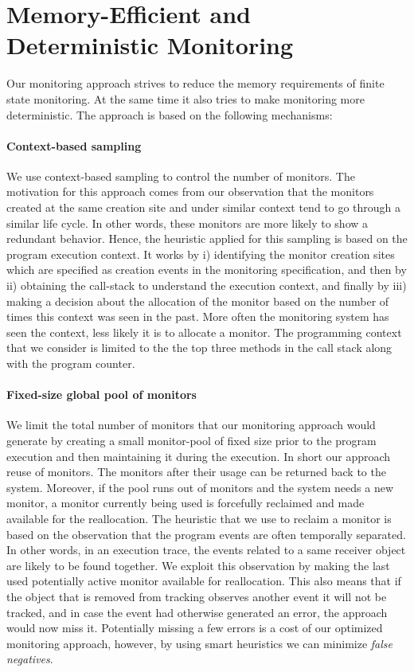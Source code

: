 \section{Memory-Efficient and Deterministic Monitoring}
\label{sec:approach}

Our monitoring approach strives to reduce the memory requirements of finite 
state monitoring. At the same time it also tries to make monitoring more 
deterministic. The approach is based on the following mechanisms:

\paragraph{Context-based sampling} We use context-based sampling to control the 
number of monitors. The motivation for this approach comes from our observation 
that the monitors created at the same creation site and under similar context 
tend to go through a similar life cycle. In other words, these monitors are more 
likely to show a redundant behavior. Hence, the heuristic applied for this 
sampling is based on the program execution context. It works by i) identifying 
the monitor creation sites which are specified as creation events in the 
monitoring specification, and then by ii) obtaining the call-stack to understand 
the execution context, and finally by iii) making a decision about the 
allocation of the monitor based on the number of times this context was seen in 
the past. More often the monitoring system has seen the context, less likely it 
is to allocate a monitor. The programming context that we consider is limited to 
the the top three methods in the call stack along with the program counter.

\paragraph{Fixed-size global pool of monitors} We limit the total number of 
monitors that our monitoring approach would generate by creating a small 
monitor-pool of fixed size prior to the program execution and then maintaining 
it during the execution. In short our approach reuse of monitors. The monitors 
after their usage can be returned back to the system. Moreover, if the pool runs 
out of monitors and the system needs a new monitor, a monitor currently being 
used is forcefully reclaimed and made available for the reallocation. The 
heuristic that we use to reclaim a monitor is based on the observation that the 
program events are often temporally separated. In other words, in an execution 
trace, the events related to a same receiver object are likely to be found 
together. We exploit this observation by making the last used potentially active 
monitor available for reallocation. This also means that if the object that is 
removed from tracking observes another event it will not be tracked, and in case 
the 
event had otherwise generated an error, the approach would now miss it. 
Potentially missing a few errors is a cost of our optimized monitoring approach, 
however, by using smart heuristics we can minimize \textit{false negatives}.

